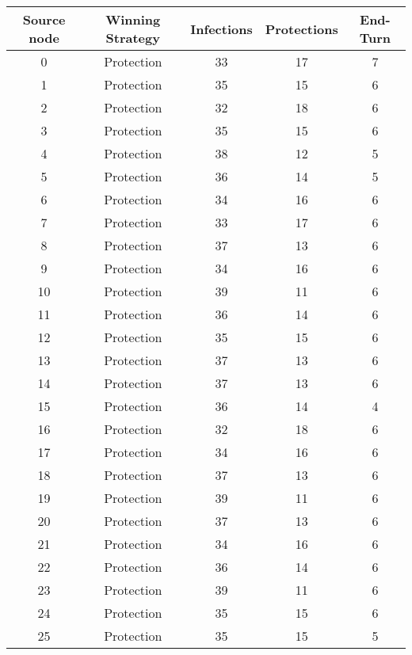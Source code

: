 \documentclass[results.tex]{subfiles}
\begin{document}
\begin{center}
  \begin{tabular}{| c || c | c | c | c |}
    \hline
    {\bfseries Source node} & {\bfseries Winning Strategy} & {\bfseries Infections} & {\bfseries Protections} & {\bfseries End-Turn} \\  %
    \hline\hline
    0 & Protection & 33 & 17 & 7 \\ 
    \hline
    1 & Protection & 35 & 15 & 6 \\ 
    \hline
    2 & Protection & 32 & 18 & 6 \\ 
    \hline
    3 & Protection & 35 & 15 & 6 \\ 
    \hline
    4 & Protection & 38 & 12 & 5 \\ 
    \hline
    5 & Protection & 36 & 14 & 5 \\ 
    \hline
    6 & Protection & 34 & 16 & 6 \\ 
    \hline
    7 & Protection & 33 & 17 & 6 \\ 
    \hline
    8 & Protection & 37 & 13 & 6 \\ 
    \hline
    9 & Protection & 34 & 16 & 6 \\ 
    \hline
    10 & Protection & 39 & 11 & 6 \\ 
    \hline
    11 & Protection & 36 & 14 & 6 \\ 
    \hline
    12 & Protection & 35 & 15 & 6 \\ 
    \hline
    13 & Protection & 37 & 13 & 6 \\ 
    \hline
    14 & Protection & 37 & 13 & 6 \\ 
    \hline
    15 & Protection & 36 & 14 & 4 \\ 
    \hline
    16 & Protection & 32 & 18 & 6 \\ 
    \hline
    17 & Protection & 34 & 16 & 6 \\ 
    \hline
    18 & Protection & 37 & 13 & 6 \\ 
    \hline
    19 & Protection & 39 & 11 & 6 \\ 
    \hline
    20 & Protection & 37 & 13 & 6 \\ 
    \hline
    21 & Protection & 34 & 16 & 6 \\ 
    \hline
    22 & Protection & 36 & 14 & 6 \\ 
    \hline
    23 & Protection & 39 & 11 & 6 \\ 
    \hline
    24 & Protection & 35 & 15 & 6 \\ 
    \hline
    25 & Protection & 35 & 15 & 5 \\ 

\end{tabular}
\end{center}
\end{document}
